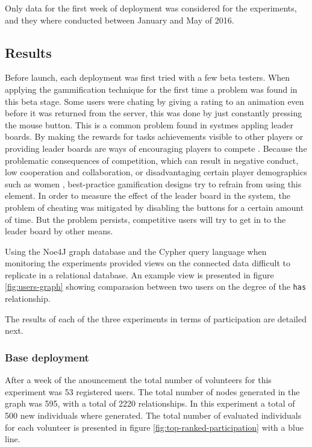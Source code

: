 \documentclass[conference]{IEEEtran}
\begin{document}
Only data for the first week of deployment was considered for the experiments, and they where conducted 
between January and May of 2016. 

\subsection{Results}
\label{sec:results}

Before launch, each deployment was first tried with a few beta testers. When applying the gammification
technique for the first time a problem was found in this beta stage. Some users were chating by 
giving a rating to an animation even before it was returned from the server, this was done by just
constantly pressing the mouse button. This is a common problem found in systmes appling leader boards.
By making the rewards for tasks achievements visible to other players or providing leader boards are ways of 
encouraging players to compete \cite{hickman2010total}. Because the  problematic consequences of competition, 
which can result in negative conduct, low cooperation and collaboration, or disadvantaging certain player
demographics such as women \cite{kumar2013gamification}, best-practice gamification designs try to
refrain from using this element. In order to measure the effect of the leader board in the system, the 
problem of cheating was mitigated by disabling the buttons for a certain amount of time. But the problem 
persists, competitive users will try to get in to the leader board by other means. 
% 
%

Using the Noe4J graph database and the Cypher query language when monitoring the experiments provided 
views on the connected data difficult to replicate in a relational database. An example view is presented 
in figure \ref{fig:users-graph} showing comparasion between two users on the degree of the 
{\tt has} relationship.  

The results of each of the three experiments in terms of participation are detailed next.

\subsubsection{ Base deployment}
After a week of the anouncement the total number of volunteers for this experiment was 53 registered users. 
The total number of nodes generated in the graph was 595, with a total of 2220 relationships. In this
experiment a total of 500 new individuals where generated. The total number of evaluated
individuals for each volunteer is presented in figure \ref{fig:top-ranked-participation} with a blue line. 
\end{document}
